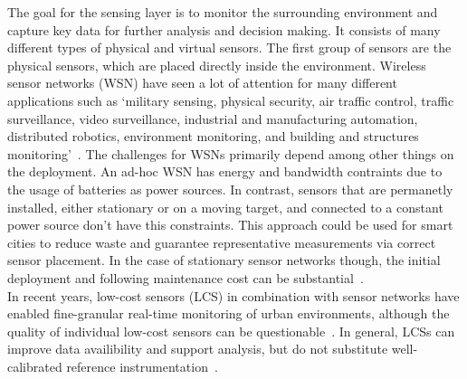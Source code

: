 The goal for the sensing layer is to monitor the surrounding environment and capture key data for further analysis and decision making. It consists of many different types of physical and virtual sensors. The first group of sensors are the physical sensors, which are placed directly inside the environment. Wireless sensor networks (WSN) have seen a lot of attention for many different applications such as `military sensing, physical security, air traffic control, traffic surveillance, video surveillance, industrial and manufacturing automation, distributed robotics, environment monitoring, and building and structures monitoring'~\cite{chong2003sensor}. The challenges for WSNs primarily depend among other things on the deployment. An ad-hoc WSN has energy and bandwidth contraints due to the usage of batteries as power sources.
In contrast, sensors that are permanetly installed, either stationary or on a moving target, and connected to a constant power source don't have this constraints. This approach could be used for smart cities to reduce waste and guarantee representative measurements via correct sensor placement. In the case of stationary sensor networks though, the initial deployment and following maintenance cost can be substantial~\cite{chapman2015birmingham}.\\
In recent years, low-cost sensors (LCS) in combination with sensor networks have enabled fine-granular real-time monitoring of urban environments, although the quality of individual low-cost sensors can be questionable~\cite{castell2017can}. In general, LCSs can improve data availibility and support analysis, but do not substitute well-calibrated reference instrumentation~\cite{lewis2018low}.

